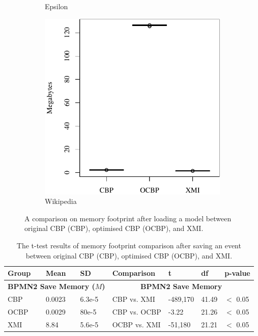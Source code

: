 {\begin{figure}[ht]
\begin{subfigure}{0.325\textwidth}
    \caption{Epsilon}
    \label{fig:load_memory_epsilon}
  \end{subfigure}
  \hfill
  \begin{subfigure}{0.325\textwidth}
    \centering
    \includegraphics[width=\linewidth]{images/ol_load_memory_wikipedia}
    \caption{Wikipedia}
    \label{fig:load_memory_wikipedia}
  \end{subfigure}
  \caption{A comparison on memory footprint after loading a model between original CBP (CBP), optimised CBP (OCBP), and XMI.}
  \label{fig:loadmemory}
\end{figure}


\begin{table}[ht]
\footnotesize
\centering
\caption{The t-test results of memory footprint comparison after saving an event between original CBP (CBP), optimised CBP (OCBP), and XMI.}
\label{table:ttest_results_save_memory}
\begin{tabular}
{|p{}p{}p{}|p{}p{}p{}p{}|}
\hline 

Group & Mean & SD & Comparison & t  & df & p-value \\
\hline 
\multicolumn{3}{|c|}{\textbf{BPMN2 Save Memory ($M$)}} & \multicolumn{4}{c|}{\textbf{BPMN2 Save Memory}} \\
CBP &0.0023    & 6.3e-5 & CBP vs. XMI &  -489,170    & 41.49 & $<$ 0.05 \\  
OCBP &0.0029    & 80e-5 & CBP vs. OCBP & -3.22 & 21.26 & $<$ 0.05 \\
XMI & 8.84   & 5.6e-5 & OCBP vs. XMI & -51,180    &  21.21  & $<$ 0.05 \\ 
\hline 


\end{tabular}
\end{table}}

